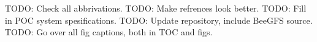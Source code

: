 TODO: Check all abbrivations.
TODO: Make refrences look better.
TODO: Fill in POC system spesifications.
TODO: Update repository, include BeeGFS source.
TODO: Go over all fig captions, both in TOC and figs.